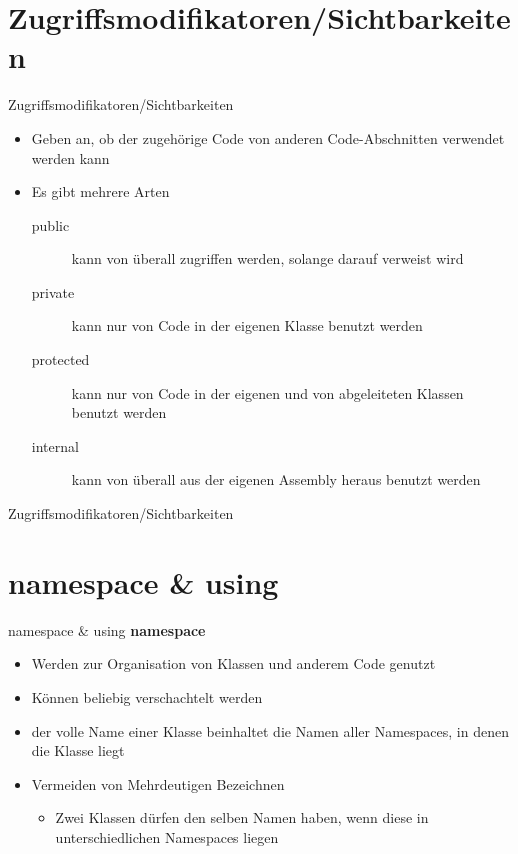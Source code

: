 \section{Zugriffsmodifikatoren/Sichtbarkeiten}
\begin{frame}{Zugriffsmodifikatoren/Sichtbarkeiten}
	\begin{itemize}
		\item Geben an, ob der zugehörige Code von anderen Code-Abschnitten verwendet werden kann
		\item Es gibt mehrere Arten
		\begin{description}
			\item[public] kann von überall zugriffen werden, solange darauf verweist wird
			\item[private] kann nur von Code in der eigenen Klasse benutzt werden
			\item[protected] kann nur von Code in der eigenen und von abgeleiteten Klassen benutzt werden
			\item[internal] kann von überall aus der eigenen Assembly heraus benutzt werden
		\end{description}
	\end{itemize}
\end{frame}

\begin{frame}{Zugriffsmodifikatoren/Sichtbarkeiten}
	
\end{frame}

\section{namespace \& using}
\begin{frame}{namespace \& using}
	\textbf{namespace}\\
	\begin{itemize}
		\item Werden zur Organisation von Klassen und anderem Code genutzt 
		\item Können beliebig verschachtelt werden
		\item der volle Name einer Klasse beinhaltet die Namen aller Namespaces, in denen die Klasse liegt
		\item Vermeiden von Mehrdeutigen Bezeichnen 
		\begin{itemize}
			\item Zwei Klassen dürfen den selben Namen haben, wenn diese in unterschiedlichen Namespaces liegen		
		\end{itemize}
	\end{itemize}	
	
\end{frame}

